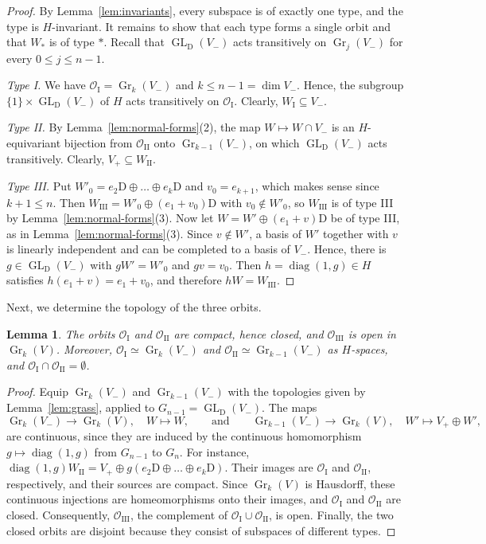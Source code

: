 \documentclass[11pt]{amsart}
\numberwithin{equation}{section}
\theoremstyle{plain}
\newtheorem{lemma}[theorem]{Lemma}
\theoremstyle{definition}
\theoremstyle{remark}
\DeclareMathOperator{\GL}{GL}
\DeclareMathOperator{\Gr}{Gr}
\DeclareMathOperator{\diag}{diag}
\newcommand{\OI}{\mathcal{O}_{\mathrm{I}}}
\newcommand{\OII}{\mathcal{O}_{\mathrm{II}}}
\newcommand{\OIII}{\mathcal{O}_{\mathrm{III}}}
\newcommand{\WI}{W_{\mathrm{I}}}
\newcommand{\WII}{W_{\mathrm{II}}}
\newcommand{\WIII}{W_{\mathrm{III}}}
\begin{document}
\begin{proof}
	By Lemma~\ref{lem:invariants}, every subspace is of exactly one type, and the type is $H$-invariant. It remains to show that each type forms a single orbit and that $W_*$ is of type $*$. Recall that $\GL_{\mathrm{D}}(V_-)$ acts transitively on $\Gr_j(V_-)$ for every $0\le j\le n-1$.
	
	\emph{Type I.} We have $\OI=\Gr_k(V_-)$ and $k\le n-1=\dim V_-$. Hence, the subgroup $\{1\}\times\GL_{\mathrm{D}}(V_-)$ of $H$ acts transitively on $\OI$. Clearly, $\WI\subseteq V_-$.
	
	\emph{Type II.} By Lemma~\ref{lem:normal-forms}(2), the map $W\mapsto W\cap V_-$ is an $H$-equivariant bijection from $\OII$ onto $\Gr_{k-1}(V_-)$, on which $\GL_{\mathrm{D}}(V_-)$ acts transitively. Clearly, $V_+\subseteq\WII$.
	
	\emph{Type III.} Put $W'_0=e_2\mathrm{D}\oplus\dots\oplus e_k\mathrm{D}$ and $v_0=e_{k+1}$, which makes sense since $k+1\le n$. Then $\WIII=W'_0\oplus(e_1+v_0)\mathrm{D}$ with $v_0\notin W'_0$, so $\WIII$ is of type III by Lemma~\ref{lem:normal-forms}(3). Now let $W=W'\oplus(e_1+v)\mathrm{D}$ be of type III, as in Lemma~\ref{lem:normal-forms}(3). Since $v\notin W'$, a basis of $W'$ together with $v$ is linearly independent and can be completed to a basis of $V_-$. Hence, there is $g\in\GL_{\mathrm{D}}(V_-)$ with $gW'=W'_0$ and $gv=v_0$. Then $h=\diag(1,g)\in H$ satisfies $h(e_1+v)=e_1+v_0$, and therefore $hW=\WIII$.
\end{proof}

Next, we determine the topology of the three orbits.

\begin{lemma}\label{lem:orbit-topology}
	The orbits $\OI$ and $\OII$ are compact, hence closed, and $\OIII$ is open in $\Gr_k(V)$. Moreover, $\OI\simeq\Gr_k(V_-)$ and $\OII\simeq\Gr_{k-1}(V_-)$ as $H$-spaces, and $\OI\cap\OII=\emptyset$.
\end{lemma}

\begin{proof}
	Equip $\Gr_k(V_-)$ and $\Gr_{k-1}(V_-)$ with the topologies given by Lemma~\ref{lem:grass}, applied to $G_{n-1}=\GL_{\mathrm{D}}(V_-)$. The maps
	$$
	\Gr_k(V_-)\to\Gr_k(V),\quad W\mapsto W,\qquad\text{and}\qquad\Gr_{k-1}(V_-)\to\Gr_k(V),\quad W'\mapsto V_+\oplus W',
	$$
	are continuous, since they are induced by the continuous homomorphism $g\mapsto\diag(1,g)$ from $G_{n-1}$ to $G_n$. For instance, $\diag(1,g)\WII=V_+\oplus g(e_2\mathrm{D}\oplus\dots\oplus e_k\mathrm{D})$. Their images are $\OI$ and $\OII$, respectively, and their sources are compact. Since $\Gr_k(V)$ is Hausdorff, these continuous injections are homeomorphisms onto their images, and $\OI$ and $\OII$ are closed. Consequently, $\OIII$, the complement of $\OI\cup\OII$, is open. Finally, the two closed orbits are disjoint because they consist of subspaces of different types.
\end{proof}
\end{document}
